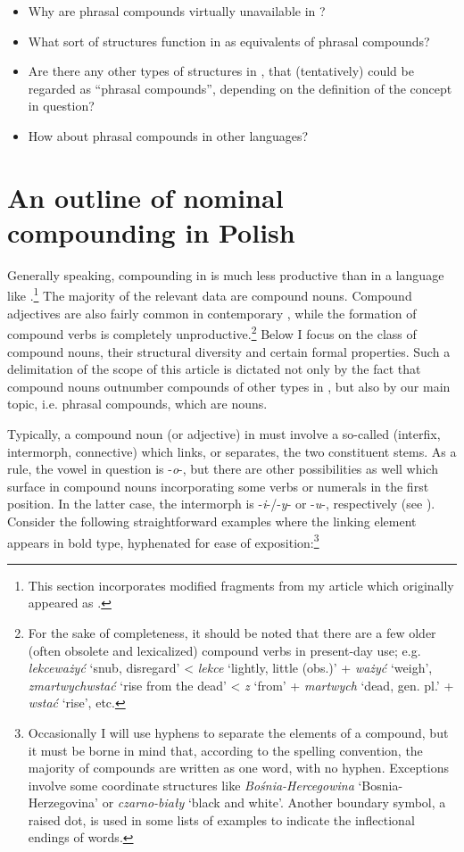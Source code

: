 \documentclass[output=paper]{LSP/langsci}
\begin{document}
\begin{itemize}
\item Why are phrasal compounds virtually unavailable in ?
\item What sort of structures function in  as equivalents of  phrasal compounds?
\item Are there any other types of structures in , that (tentatively) could be regarded as “phrasal compounds”, depending on the definition of the concept in question?
\item  How about phrasal compounds in other  languages?
\end{itemize}

\section{An outline of nominal compounding in Polish} \label{sec:szymanek:2}
Generally speaking, compounding in  is much less productive than in a language like .\footnote{This section incorporates modified fragments from my article which originally appeared as \citet{Szymanek2009}.} The majority of the relevant data are compound nouns. Compound adjectives are also fairly common in contemporary , while the formation of compound verbs is completely unproductive.\footnote{For the sake of completeness, it should be noted that there are a few older (often obsolete and lexicalized) compound verbs in present-day use; e.g. \textit{lekceważyć} ‘snub, disregard’ < \textit{lekce} ‘lightly, little (obs.)’ + \textit{ważyć} ‘weigh’, \textit{zmartwychwstać} ‘rise from the dead’ < \textit{z} ‘from’ + \textit{martwych} ‘dead, gen. pl.’ + \textit{wstać} ‘rise’, etc.} Below I focus on the class of compound nouns, their structural diversity and certain formal properties. Such a delimitation of the scope of this article is dictated not only by the fact that compound nouns outnumber compounds of other types in , but also by our main topic, i.e. phrasal compounds, which are nouns.


Typically, a compound noun (or adjective) in  must involve a so-called  (interfix, intermorph, connective) which links, or separates, the two constituent stems. As a rule, the vowel in question is -{\textit{o}}{-, but there are other possibilities as well which surface in compound nouns incorporating some verbs or numerals in the first position. In the latter case, the intermorph is -}{\textit{i}}{-/-}{\textit{y}}{- or -}{\textit{u}}{-, respectively (see \citealt[458]{GrzegorczykowaPuzynina1999}). Consider the following straightforward examples where the linking element appears in bold type, hyphenated for ease of exposition:}\footnote{{Occasionally I will use hyphens to separate the elements of a compound, but it must be borne in mind that, according to the spelling convention, the majority of  compounds are written as one word, with no hyphen. Exceptions involve some coordinate structures like} {\textit{Bośnia-Hercegowina}} {‘Bosnia-Herzegovina’ or} {\textit{czarno-biały}} {‘black and white’. Another boundary symbol, a raised dot, is used in some lists of examples to indicate the inflectional endings of words.}}
\end{document}
